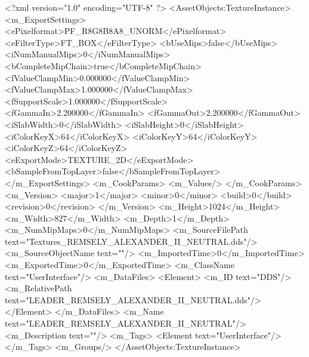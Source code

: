 <?xml version="1.0" encoding="UTF-8" ?>
<AssetObjects:TextureInstance>
	<m_ExportSettings>
		<ePixelformat>PF_R8G8B8A8_UNORM</ePixelformat>
		<eFilterType>FT_BOX</eFilterType>
		<bUseMips>false</bUseMips>
		<iNumManualMips>0</iNumManualMips>
		<bCompleteMipChain>true</bCompleteMipChain>
		<fValueClampMin>0.000000</fValueClampMin>
		<fValueClampMax>1.000000</fValueClampMax>
		<fSupportScale>1.000000</fSupportScale>
		<fGammaIn>2.200000</fGammaIn>
		<fGammaOut>2.200000</fGammaOut>
		<iSlabWidth>0</iSlabWidth>
		<iSlabHeight>0</iSlabHeight>
		<iColorKeyX>64</iColorKeyX>
		<iColorKeyY>64</iColorKeyY>
		<iColorKeyZ>64</iColorKeyZ>
		<eExportMode>TEXTURE_2D</eExportMode>
		<bSampleFromTopLayer>false</bSampleFromTopLayer>
	</m_ExportSettings>
	<m_CookParams>
		<m_Values/>
	</m_CookParams>
	<m_Version>
		<major>1</major>
		<minor>0</minor>
		<build>0</build>
		<revision>0</revision>
	</m_Version>
	<m_Height>1024</m_Height>
	<m_Width>827</m_Width>
	<m_Depth>1</m_Depth>
	<m_NumMipMaps>0</m_NumMipMaps>
	<m_SourceFilePath text="Textures\LEADER_REMSELY_ALEXANDER_II_NEUTRAL.dds"/>
	<m_SourceObjectName text=""/>
	<m_ImportedTime>0</m_ImportedTime>
	<m_ExportedTime>0</m_ExportedTime>
	<m_ClassName text="UserInterface"/>
	<m_DataFiles>
		<Element>
			<m_ID text="DDS"/>
			<m_RelativePath text="LEADER_REMSELY_ALEXANDER_II_NEUTRAL.dds"/>
		</Element>
	</m_DataFiles>
	<m_Name text="LEADER_REMSELY_ALEXANDER_II_NEUTRAL"/>
	<m_Description text=""/>
	<m_Tags>
		<Element text="UserInterface"/>
	</m_Tags>
	<m_Groups/>
</AssetObjects:TextureInstance>
